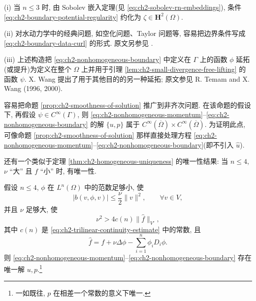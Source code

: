 \hypertarget{chapter-02-page-135}{}
\begin{Remark}
\label{rem:ch2-nonhomogeneous-lifting}
(i) 当 $n\leq3$ 时, 由 Sobolev 嵌入定理(见 \eqref{eq:ch2-sobolev-rn-embeddings}), 条件 \eqref{eq:ch2-boundary-potential-regularity} 约化为 $\zeta\in\mathbf H^2(\Omega)$.

(ii) 对水动力学中的经典问题, 如空化问题、Taylor 问题等, 容易把边界条件写成 \eqref{eq:ch2-boundary-data-curl} 的形式. 原文另参见 .

(iii) 上述构造把 \eqref{eq:ch2-nonhomogeneous-boundary} 中定义在 $\Gamma$ 上的函数 $\phi$ 延拓(或提升)为定义在整个 $\Omega$ 上并用于引理 \ref{lem:ch2-small-divergence-free-lifting} 的函数 $\psi$. X. Wang 提出了用于其他目的的另一种延拓; 原文参见 R. Temam and X. Wang (1996, 2000).
\end{Remark}

\begin{Remark}
\label{rem:ch2-nonhomogeneous-regularity}
容易把命题 \ref{prop:ch2-smoothness-of-solution} 推广到非齐次问题. 在该命题的假设下, 再假设 $\psi\in C^\infty(\Gamma)$, 则 \eqref{eq:ch2-nonhomogeneous-momentum}--\eqref{eq:ch2-nonhomogeneous-boundary} 的解 $\{u,p\}$ 属于 $C^\infty(\overline\Omega)\times C^\infty(\overline\Omega)$. 为证明此点, 可像命题 \ref{prop:ch2-smoothness-of-solution} 那样直接处理方程 \eqref{eq:ch2-nonhomogeneous-momentum}--\eqref{eq:ch2-nonhomogeneous-boundary}(即不引入 $\widehat u$).
\end{Remark}

还有一个类似于定理 \ref{thm:ch2-homogeneous-uniqueness} 的唯一性结果: 当 $n\leq4$, $\nu$ ``大'' 且 $f$ ``小'' 时, 有唯一性.

\begin{Theorem}
\label{thm:ch2-nonhomogeneous-uniqueness}
假设 $n\leq4$, $\phi$ 在 $L^n(\Omega)$ 中的范数足够小, 使
\begin{equation}
|b(v,\phi,v)|\leq\frac\nu2\lVert v\rVert^2,
\qquad\forall v\in V,
\label{eq:ch2-boundary-data-smallness}
\end{equation}
并且 $\nu$ 足够大, 使
\begin{equation}
\nu^2>4c(n)\lVert\widehat f\rVert_{V'},
\label{eq:ch2-nonhomogeneous-uniqueness-condition}
\end{equation}
其中 $c(n)$ 是 \eqref{eq:ch2-trilinear-continuity-estimate} 中的常数, 且
\begin{equation}
\widehat f=f+\nu\Delta\phi-\sum_{i=1}^{n}\phi_iD_i\phi.
\label{eq:ch2-nonhomogeneous-effective-force}
\end{equation}
则 \eqref{eq:ch2-nonhomogeneous-momentum}--\eqref{eq:ch2-nonhomogeneous-boundary} 存在唯一解 $u,p$.\footnote{一如既往, $p$ 在相差一个常数的意义下唯一.}
\end{Theorem}

